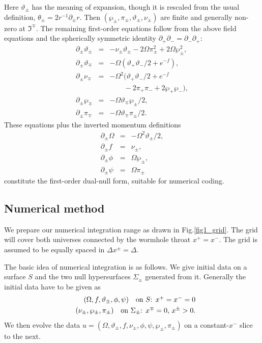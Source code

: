 \documentclass[aps,showpacs,twocolumn,draft,eqsecnum]{revtex4}
\begin{document}
Here $\vartheta_\pm$ has the meaning of expansion, though it is rescaled from
the usual definition, $\theta_\pm = 2 r^{-1} \partial_\pm r$. Then
$(\wp_\pm,\pi_\pm,\vartheta_\pm,\nu_\pm)$ are finite and generally non-zero at
$\Im^\mp$. The remaining first-order equations follow from the above field
equations and the spherically symmetric identity
$\partial_+\partial_-=\partial_-\partial_+$:
\begin{eqnarray}
\partial_\pm\vartheta_\pm&=&
-\nu_\pm\vartheta_\pm
-2\Omega\pi_\pm^2
+2\Omega\wp_\pm^2, \label{eq1}\\
\partial_\pm\vartheta_\mp&=&
-\Omega(\vartheta_+\vartheta_-/2+e^{-f}),\label{eq2}\\
\partial_\pm\nu_\mp&=&
-\Omega^2(\vartheta_+\vartheta_-/2+e^{-f} \nonumber \\
&&\qquad -2\pi_+\pi_-+2\wp_+\wp_-),
\label{eq3}\\
\partial_\pm\wp_\mp&=&-\Omega\vartheta_\mp\wp_\pm/2, \label{eq4}\\
\partial_\pm\pi_\mp&=&-\Omega\vartheta_\mp\pi_\pm/2. \label{eq5}
\end{eqnarray}
These equations plus the inverted momentum definitions
\begin{eqnarray}
\partial_\pm\Omega&=&-\Omega^2\vartheta_\pm/2,
\label{deftheta2}\\
\partial_\pm f&=&\nu_\pm, \label{defnu2} \\
\partial_\pm\phi&=&\Omega\wp_\pm, \label{defwp2}\\
\partial_\pm\psi&=&\Omega\pi_\pm \label{defpi2}
\end{eqnarray}
constitute the first-order dual-null form, suitable for numerical coding.

\subsection{Numerical method}
We prepare our numerical integration range as drawn in Fig.\ref{fig1_grid}. The
grid will cover both universes connected by the wormhole throat $x^+=x^-$. The
grid is assumed to be equally spaced in $\Delta x^\pm=\Delta$.

The basic idea of numerical integration is as follows. We give initial data on
a surface $S$ and the two null hypersurfaces $\Sigma_\pm$ generated from it.
Generally the initial data have to be given as
\begin{eqnarray}
&&(\Omega,f,\vartheta_\pm,\phi,\psi)\quad\hbox{on $S$: $x^+=x^-=0$}\\
&&(\nu_\pm,\wp_\pm,\pi_\pm)\quad\hbox{on $\Sigma_\pm$: $x^\mp=0$, $x^\pm>0$.}
\end{eqnarray}
We then evolve the data $u=(\Omega, \vartheta_\pm, f, \nu_\pm, \phi,
\psi, \wp_\pm, \pi_\pm)$ on a constant-$x^-$ slice to the next.
\end{document}
